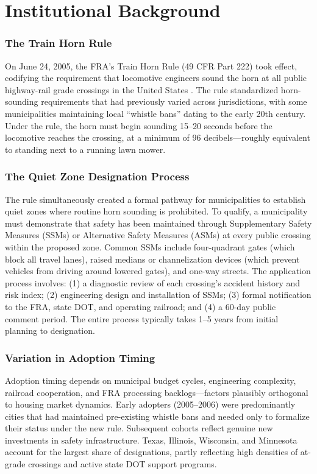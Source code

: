 \documentclass[12pt]{article}
\begin{document}
\section{Institutional Background}

\subsubsection*{The Train Horn Rule} On June 24, 2005, the FRA's Train Horn Rule (49 CFR Part 222) took effect, codifying the requirement that locomotive engineers sound the horn at all public highway-rail grade crossings in the United States \citep{fra2005trainhorn}. The rule standardized horn-sounding requirements that had previously varied across jurisdictions, with some municipalities maintaining local ``whistle bans'' dating to the early 20th century. Under the rule, the horn must begin sounding 15--20 seconds before the locomotive reaches the crossing, at a minimum of 96 decibels---roughly equivalent to standing next to a running lawn mower.

\subsubsection*{The Quiet Zone Designation Process} The rule simultaneously created a formal pathway for municipalities to establish quiet zones where routine horn sounding is prohibited. To qualify, a municipality must demonstrate that safety has been maintained through Supplementary Safety Measures (SSMs) or Alternative Safety Measures (ASMs) at every public crossing within the proposed zone. Common SSMs include four-quadrant gates (which block all travel lanes), raised medians or channelization devices (which prevent vehicles from driving around lowered gates), and one-way streets. The application process involves: (1) a diagnostic review of each crossing's accident history and risk index; (2) engineering design and installation of SSMs; (3) formal notification to the FRA, state DOT, and operating railroad; and (4) a 60-day public comment period. The entire process typically takes 1--5 years from initial planning to designation.

\subsubsection*{Variation in Adoption Timing} Adoption timing depends on municipal budget cycles, engineering complexity, railroad cooperation, and FRA processing backlogs---factors plausibly orthogonal to housing market dynamics. Early adopters (2005--2006) were predominantly cities that had maintained pre-existing whistle bans and needed only to formalize their status under the new rule. Subsequent cohorts reflect genuine new investments in safety infrastructure. Texas, Illinois, Wisconsin, and Minnesota account for the largest share of designations, partly reflecting high densities of at-grade crossings and active state DOT support programs.
\end{document}

